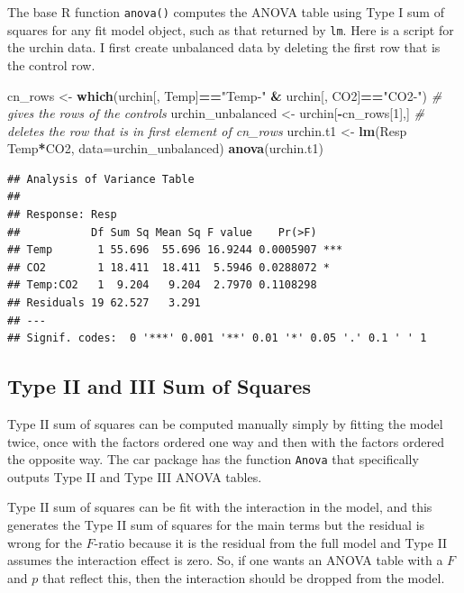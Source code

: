 \documentclass[]{book}
\newenvironment{Shaded}{\begin{snugshade}}{\end{snugshade}}
\newcommand{\KeywordTok}[1]{\textcolor[rgb]{0.13,0.29,0.53}{\textbf{#1}}}
\newcommand{\DataTypeTok}[1]{\textcolor[rgb]{0.13,0.29,0.53}{#1}}
\newcommand{\DecValTok}[1]{\textcolor[rgb]{0.00,0.00,0.81}{#1}}
\newcommand{\StringTok}[1]{\textcolor[rgb]{0.31,0.60,0.02}{#1}}
\newcommand{\CommentTok}[1]{\textcolor[rgb]{0.56,0.35,0.01}{\textit{#1}}}
\newcommand{\OperatorTok}[1]{\textcolor[rgb]{0.81,0.36,0.00}{\textbf{#1}}}
\newcommand{\NormalTok}[1]{#1}
\begin{document}
The base R function \texttt{anova()} computes the ANOVA table using Type
I sum of squares for any fit model object, such as that returned by
\texttt{lm}. Here is a script for the urchin data. I first create
unbalanced data by deleting the first row that is the control row.

\begin{Shaded}
\begin{Highlighting}[]
\NormalTok{cn_rows <-}\StringTok{ }\KeywordTok{which}\NormalTok{(urchin[, Temp]}\OperatorTok{==}\StringTok{"Temp-"} \OperatorTok{&}\StringTok{ }\NormalTok{urchin[, CO2]}\OperatorTok{==}\StringTok{"CO2-"}\NormalTok{) }\CommentTok{# gives the rows of the controls}
\NormalTok{urchin_unbalanced <-}\StringTok{ }\NormalTok{urchin[}\OperatorTok{-}\NormalTok{cn_rows[}\DecValTok{1}\NormalTok{],] }\CommentTok{# deletes the row that is in first element of cn_rows}
\NormalTok{urchin.t1 <-}\StringTok{ }\KeywordTok{lm}\NormalTok{(Resp }\OperatorTok{~}\StringTok{ }\NormalTok{Temp}\OperatorTok{*}\NormalTok{CO2, }\DataTypeTok{data=}\NormalTok{urchin_unbalanced)}
\KeywordTok{anova}\NormalTok{(urchin.t1)}
\end{Highlighting}
\end{Shaded}

\begin{verbatim}
## Analysis of Variance Table
## 
## Response: Resp
##           Df Sum Sq Mean Sq F value    Pr(>F)    
## Temp       1 55.696  55.696 16.9244 0.0005907 ***
## CO2        1 18.411  18.411  5.5946 0.0288072 *  
## Temp:CO2   1  9.204   9.204  2.7970 0.1108298    
## Residuals 19 62.527   3.291                      
## ---
## Signif. codes:  0 '***' 0.001 '**' 0.01 '*' 0.05 '.' 0.1 ' ' 1
\end{verbatim}

\subsection{Type II and III Sum of
Squares}\label{type-ii-and-iii-sum-of-squares}

Type II sum of squares can be computed manually simply by fitting the
model twice, once with the factors ordered one way and then with the
factors ordered the opposite way. The car package has the function
\texttt{Anova} that specifically outputs Type II and Type III ANOVA
tables.

Type II sum of squares can be fit with the interaction in the model, and
this generates the Type II sum of squares for the main terms but the
residual is wrong for the \(F\)-ratio because it is the residual from
the full model and Type II assumes the interaction effect is zero. So,
if one wants an ANOVA table with a \(F\) and \(p\) that reflect this,
then the interaction should be dropped from the model.
\end{document}
